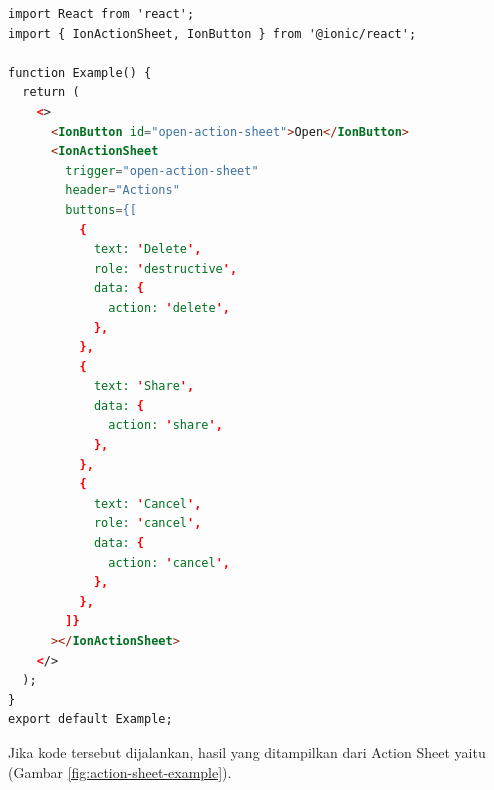 \begin{lstlisting}[language=HTML, caption=Contoh Potongan Kode Action Sheet, label=kode:ion-action-sheet]
import React from 'react';
import { IonActionSheet, IonButton } from '@ionic/react';

function Example() {
  return (
    <>
      <IonButton id="open-action-sheet">Open</IonButton>
      <IonActionSheet
        trigger="open-action-sheet"
        header="Actions"
        buttons={[
          {
            text: 'Delete',
            role: 'destructive',
            data: {
              action: 'delete',
            },
          },
          {
            text: 'Share',
            data: {
              action: 'share',
            },
          },
          {
            text: 'Cancel',
            role: 'cancel',
            data: {
              action: 'cancel',
            },
          },
        ]}
      ></IonActionSheet>
    </>
  );
}
export default Example;
\end{lstlisting}

Jika kode tersebut dijalankan, hasil yang ditampilkan dari Action Sheet yaitu (Gambar \ref{fig:action-sheet-example}).

